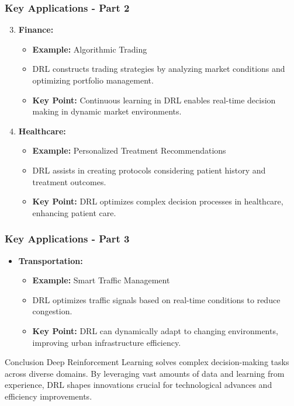 \documentclass[aspectratio=169]{beamer}
\begin{document}
\begin{frame}[fragile]
    \frametitle{Key Applications - Part 2}
    \begin{enumerate}
        \setcounter{enumi}{2} %
        \item \textbf{Finance:}
            \begin{itemize}
                \item \textbf{Example:} Algorithmic Trading
                \item DRL constructs trading strategies by analyzing market conditions and optimizing portfolio management.
                \item \textbf{Key Point:} Continuous learning in DRL enables real-time decision making in dynamic market environments.
            \end{itemize}
        
        \item \textbf{Healthcare:}
            \begin{itemize}
                \item \textbf{Example:} Personalized Treatment Recommendations
                \item DRL assists in creating protocols considering patient history and treatment outcomes.
                \item \textbf{Key Point:} DRL optimizes complex decision processes in healthcare, enhancing patient care.
            \end{itemize}
    \end{enumerate}
\end{frame}

\begin{frame}[fragile]
    \frametitle{Key Applications - Part 3}
    \begin{itemize}
        \item \textbf{Transportation:}
            \begin{itemize}
                \item \textbf{Example:} Smart Traffic Management
                \item DRL optimizes traffic signals based on real-time conditions to reduce congestion.
                \item \textbf{Key Point:} DRL can dynamically adapt to changing environments, improving urban infrastructure efficiency.
            \end{itemize}
    \end{itemize}

    \begin{block}{Conclusion}
        Deep Reinforcement Learning solves complex decision-making tasks across diverse domains. By leveraging vast amounts of data and learning from experience, DRL shapes innovations crucial for technological advances and efficiency improvements.
    \end{block}
\end{frame}
\end{document}
